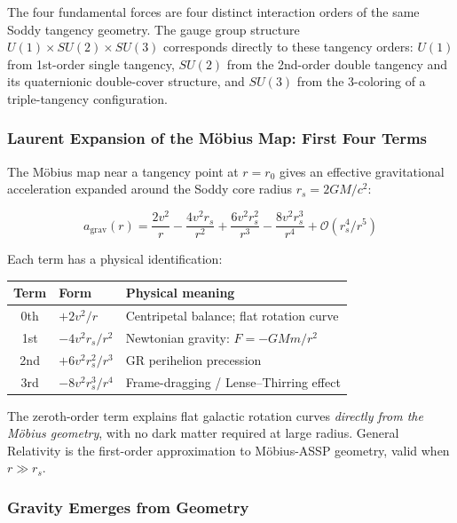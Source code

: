 \documentclass[11pt,a4paper]{article}
\begin{document}
The four fundamental forces are four distinct interaction orders of the same Soddy
tangency geometry. The gauge group structure $U(1) \times SU(2) \times SU(3)$
corresponds directly to these tangency orders: $U(1)$ from 1st-order single
tangency, $SU(2)$ from the 2nd-order double tangency and its quaternionic
double-cover structure, and $SU(3)$ from the 3-coloring of a triple-tangency
configuration.

\subsubsection{Laurent Expansion of the M\"obius Map: First Four Terms}

The M\"obius map near a tangency point at $r = r_0$ gives an effective
gravitational acceleration expanded around the Soddy core radius
$r_s = 2GM/c^2$:

\begin{equation}
  a_{\text{grav}}(r) = \frac{2v^2}{r}
    - \frac{4v^2 r_s}{r^2}
    + \frac{6v^2 r_s^2}{r^3}
    - \frac{8v^2 r_s^3}{r^4}
    + \mathcal{O}(r_s^4/r^5)
  \label{eq:laurent}
\end{equation}

Each term has a physical identification:

\begin{table}[h]
\centering
\begin{tabular}{|c|l|l|}
\hline
\textbf{Term} & \textbf{Form} & \textbf{Physical meaning} \\
\hline
0th & $+2v^2/r$ & Centripetal balance; flat rotation curve \\
1st & $-4v^2 r_s/r^2$ & Newtonian gravity: $F = -GMm/r^2$ \\
2nd & $+6v^2 r_s^2/r^3$ & GR perihelion precession \\
3rd & $-8v^2 r_s^3/r^4$ & Frame-dragging / Lense--Thirring effect \\
\hline
\end{tabular}
\end{table}

The zeroth-order term explains flat galactic rotation curves \emph{directly from
the M\"obius geometry}, with no dark matter required at large radius. General
Relativity is the first-order approximation to M\"obius-ASSP geometry, valid when
$r \gg r_s$.

\subsubsection{Gravity Emerges from Geometry}
\end{document}
